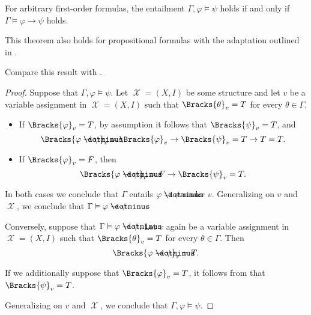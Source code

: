 \begin{theorem}\label{thm:semantic_deduction_theorem}
  For arbitrary first-order formulas, the entailment \( \Gamma, \varphi \vDash \psi \) holds if and only if \( \Gamma \vDash \varphi \to \psi \) holds.
\end{theorem}
\begin{comments}
  \item This theorem also holds for propositional formulas with the adaptation outlined in .
  \item Compare this result with .
\end{comments}
\begin{proof}
  \SufficiencySubProof Suppose that \( \Gamma, \varphi \vDash \psi \). Let \( \mscrX = (X, I) \) be some structure and let \( v \) be a variable assignment in \( \mscrX = (X, I) \) such that \( \Bracks{\theta}_v = T \) for every \( \theta \in \Gamma \).

  \begin{itemize}
    \item If \( \Bracks{\varphi}_v = T \), by assumption it follows that \( \Bracks{\psi}_v = T \), and
    \begin{equation*}
      \Bracks{\varphi \synimplies \psi}_v
      =
      \Bracks{\varphi}_v \rightarrow \Bracks{\psi}_v
      =
      T \rightarrow T
      =
      T.
    \end{equation*}

    \item If \( \Bracks{\varphi}_v = F \), then
    \begin{equation*}
      \Bracks{\varphi \synimplies \psi}_v
      =
      F \rightarrow \Bracks{\psi}_v
      =
      T.
    \end{equation*}
  \end{itemize}

  In both cases we conclude that \( \Gamma \) entails \( \varphi \synimplies \psi \) under \( v \). Generalizing on \( v \) and \( \mscrX \), we conclude that \( \Gamma \vDash \varphi \synimplies \psi \).

  \NecessitySubProof Conversely, suppose that \( \Gamma \vDash \varphi \synimplies \psi \). Let \( v \) again be a variable assignment in \( \mscrX = (X, I) \) such that \( \Bracks{\theta}_v = T \) for every \( \theta \in \Gamma \). Then
  \begin{equation*}
    \Bracks{\varphi \synimplies \psi}_v = T.
  \end{equation*}

  If we additionally suppose that \( \Bracks{\varphi}_v = T \), it follows from  that \( \Bracks{\psi}_v = T \).

  Generalizing on \( v \) and \( \mscrX \), we conclude that \( \Gamma, \varphi \vDash \psi \).
\end{proof}

